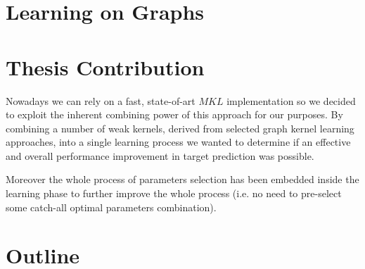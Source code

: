 \section{Learning on Graphs}


\section{Thesis Contribution}

Nowadays we can rely on a fast, state-of-art $MKL$ implementation \cite{easymkl}
so we decided to exploit the inherent combining power of this approach for our
purposes.
By combining a number of weak kernels, derived from selected graph kernel
learning approaches, into a single learning process we wanted to determine if an
effective and overall performance improvement in target prediction was possible.

Moreover the whole process of parameters selection has been embedded inside the
learning phase to further improve the whole process (i.e. no need to pre-select
some catch-all optimal parameters combination).


\section{Outline}


